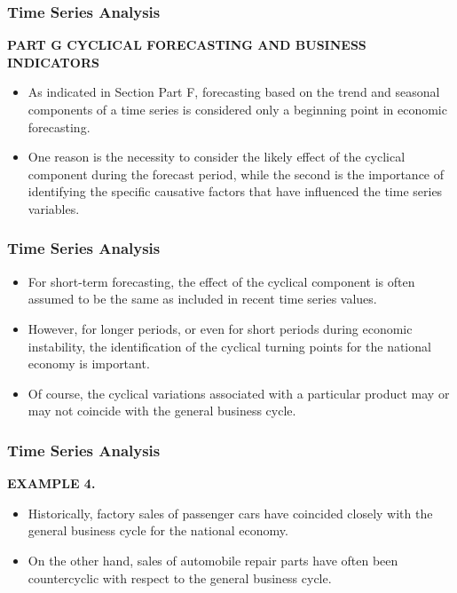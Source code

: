 
\begin{frame}
\frametitle{Time Series Analysis}
\textbf{PART G CYCLICAL FORECASTING AND BUSINESS INDICATORS}
\begin{itemize}
\item
As indicated in Section Part F, forecasting based on the trend and seasonal components of a time series is
considered only a beginning point in economic forecasting.
\item  One reason is the necessity to consider the likely
effect of the cyclical component during the forecast period, while the second is the importance of identifying the
specific causative factors that have influenced the time series variables.
\end{itemize}
\end{frame}
\begin{frame}
\frametitle{Time Series Analysis}
\begin{itemize}
\item For short-term forecasting, the effect of the cyclical component is often assumed to be the same as included
in recent time series values.
\item However, for longer periods, or even for short periods during economic instability,
the identification of the cyclical turning points for the national economy is important. 
\item Of course, the cyclical
variations associated with a particular product may or may not coincide with the general business cycle.
\end{itemize}
\end{frame}
\begin{frame}
\frametitle{Time Series Analysis}
\textbf{EXAMPLE 4.}
\begin{itemize} 
\item Historically, factory sales of passenger cars have coincided closely with the general business cycle for the
national economy.
\item On the other hand, sales of automobile repair parts have often been countercyclic with respect to the
general business cycle.
\end{itemize}
\end{frame}
